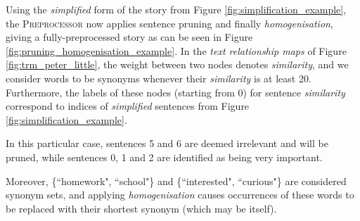 \noindent
Using the \textit{simplified} form of the story from Figure \ref{fig:simplification_example}, the \textsc{Preprocessor} now applies sentence  pruning and finally \textit{homogenisation}, giving a fully-preprocessed story as can be seen in Figure \ref{fig:pruning_homogenisation_example}. In the \textit{text relationship maps} of Figure \ref{fig:trm_peter_little}, the weight between two nodes denotes \textit{similarity}, and we consider words to be synonyms whenever their \textit{similarity} is at least 20. Furthermore, the labels of these nodes (starting from 0) for sentence \textit{similarity} correspond to indices of \textit{simplified} sentences from Figure \ref{fig:simplification_example}.

In this particular case, sentences 5 and 6 are deemed irrelevant and will be pruned, while sentences 0, 1 and 2 are identified as being very important.

Moreover, \{``homework", ``school"\} and \{``interested", ``curious"\} are considered synonym sets, and applying \textit{homogenisation} causes occurrences of these words to be replaced with their shortest synonym (which may be itself).

